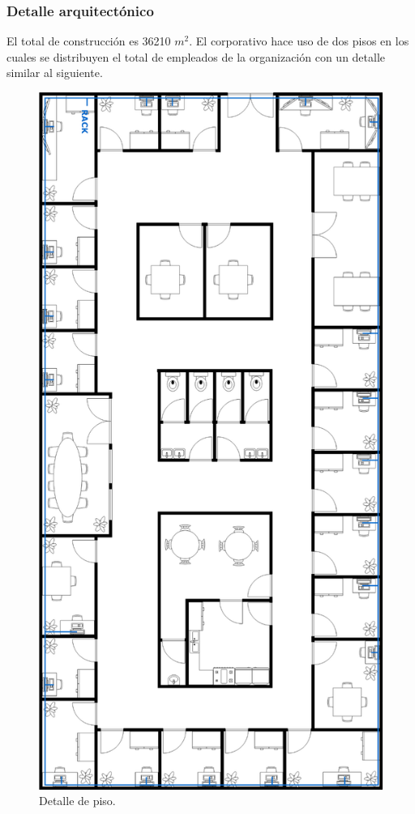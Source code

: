 \documentclass[12pt,letterpaper]{article}
\begin{document}
\subsubsection{Detalle arquitectónico}
El total de construcción es 36210 $m^2$. \cite{deatllearq} 
El corporativo hace uso de dos pisos en los cuales se distribuyen el total de empleados de la organización con un detalle similar 
al siguiente.
\begin{figure}[ht]
    \centering
    \includegraphics[scale=.78]{imagenes/detalle.png}
    \caption{Detalle de piso.}
\end{figure}
\end{document}
